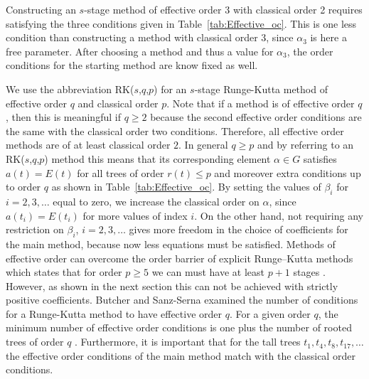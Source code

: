 \begin{example}\label{ex:Effective_RK32}
	Constructing an $s$-stage method of effective order 3 with classical order 2 requires satisfying the three conditions given in Table~\ref{tab:Effective_oc}. This is one less condition than constructing a method with classical order 3, since $\alpha_3$ is here a free parameter. After choosing a method and thus a value for $\alpha_3$, the order conditions for the starting method are know fixed as well.
\end{example}

We use the abbreviation RK($s$,$q$,$p$) for an $s$-stage Runge-Kutta method of effective order $q$ and classical order $p$. Note that if a method is of effective order $q$, then this is meaningful if $q \geq 2$ because the second effective order conditions are the same with the classical order two conditions. Therefore, all effective order methods are of at least classical order $2$. In general $q \geq p$ and by referring to an RK($s$,$q$,$p$) method this means that its corresponding element $\alpha \in G$ satisfies $a(t) = E(t)$ for all trees of order $r(t) \leq p$ and moreover extra conditions up to order $q$ as shown in Table~\ref{tab:Effective_oc}.
By setting the values of $\beta_{i}$ for $i = 2, 3, \dots$ equal to zero, we increase the classical order on $\alpha$, since $a(t_{i}) = E(t_{i})$ for more values of index $i$. On the other hand, not requiring any restriction on $\beta_{i}$, $i = 2, 3, \dots$ gives more freedom in the choice of coefficients for the main method, because now less equations must be satisfied. Methods of effective order can overcome the order barrier of explicit Runge--Kutta methods which states that for order $p \ge 5$ we can must have at least $p+1$ stages \cite{Butcher1998}. However, as shown in the next section this can not be achieved with strictly positive coefficients.    
Butcher and Sanz-Serna examined the number of conditions for a Runge-Kutta method to have effective order $q$. For a given order $q$, the minimum number of effective order conditions is one plus the number of rooted trees of order $q$ \cite{Butcher1996}. Furthermore, it is important that for the tall trees $t_1, t_4, t_8, t_{17}, \dots$ the effective order conditions of the main method match with the classical order conditions.



